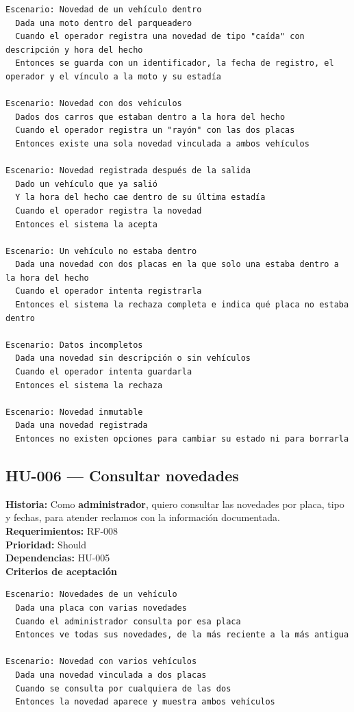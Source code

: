 \begin{lstlisting}[style=gherkin]
Escenario: Novedad de un vehículo dentro
  Dada una moto dentro del parqueadero
  Cuando el operador registra una novedad de tipo "caída" con descripción y hora del hecho
  Entonces se guarda con un identificador, la fecha de registro, el operador y el vínculo a la moto y su estadía

Escenario: Novedad con dos vehículos
  Dados dos carros que estaban dentro a la hora del hecho
  Cuando el operador registra un "rayón" con las dos placas
  Entonces existe una sola novedad vinculada a ambos vehículos

Escenario: Novedad registrada después de la salida
  Dado un vehículo que ya salió
  Y la hora del hecho cae dentro de su última estadía
  Cuando el operador registra la novedad
  Entonces el sistema la acepta

Escenario: Un vehículo no estaba dentro
  Dada una novedad con dos placas en la que solo una estaba dentro a la hora del hecho
  Cuando el operador intenta registrarla
  Entonces el sistema la rechaza completa e indica qué placa no estaba dentro

Escenario: Datos incompletos
  Dada una novedad sin descripción o sin vehículos
  Cuando el operador intenta guardarla
  Entonces el sistema la rechaza

Escenario: Novedad inmutable
  Dada una novedad registrada
  Entonces no existen opciones para cambiar su estado ni para borrarla
\end{lstlisting}

\subsection{HU-006 — Consultar novedades}
\textbf{Historia:} Como \textbf{administrador}, quiero consultar las novedades por placa, tipo y fechas, para atender reclamos con la información documentada.\\
\textbf{Requerimientos:} RF-008\\
\textbf{Prioridad:} Should\\
\textbf{Dependencias:} HU-005\\
\textbf{Criterios de aceptación}

\begin{lstlisting}[style=gherkin]
Escenario: Novedades de un vehículo
  Dada una placa con varias novedades
  Cuando el administrador consulta por esa placa
  Entonces ve todas sus novedades, de la más reciente a la más antigua

Escenario: Novedad con varios vehículos
  Dada una novedad vinculada a dos placas
  Cuando se consulta por cualquiera de las dos
  Entonces la novedad aparece y muestra ambos vehículos
\end{lstlisting}

